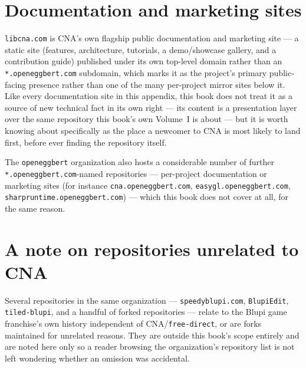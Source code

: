 \section{Documentation and marketing sites}

\texttt{libcna.com} is CNA's own flagship public documentation and marketing site --- a
static site (features, architecture, tutorials, a demo/showcase gallery, and a
contribution guide) published under its own top-level domain rather than an
\texttt{*.openeggbert.com} subdomain, which marks it as the project's primary public-facing
presence rather than one of the many per-project mirror sites below it. Like every
documentation site in this appendix, this book does not treat it as a source of new technical
fact in its own right --- its content is a presentation layer over the same repository this
book's own Volume~I is about --- but it is worth knowing about specifically as the place a
newcomer to CNA is most likely to land first, before ever finding the repository itself.

The \texttt{openeggbert} organization also hosts a considerable number of further
\texttt{*.openeggbert.com}-named repositories --- per-project documentation or marketing
sites (for instance \texttt{cna.openeggbert.com}, \texttt{easygl.openeggbert.com},
\texttt{sharpruntime.openeggbert.com}) --- which this book does not cover at all, for the
same reason.

\section{A note on repositories unrelated to CNA}

Several repositories in the same organization --- \texttt{speedyblupi.com},
\texttt{BlupiEdit}, \texttt{tiled-blupi}, and a handful of forked repositories --- relate to
the Blupi game franchise's own history independent of CNA/\texttt{free-direct}, or are forks
maintained for unrelated reasons. They are outside this book's scope entirely and are noted
here only so a reader browsing the organization's repository list is not left wondering
whether an omission was accidental.
